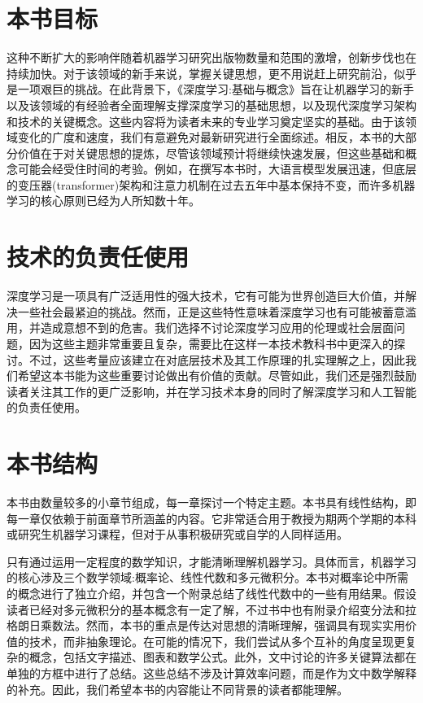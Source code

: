 \documentclass[10pt]{article}
\begin{document}
\section*{本书目标}

这种不断扩大的影响伴随着机器学习研究出版物数量和范围的激增，创新步伐也在持续加快。对于该领域的新手来说，掌握关键思想，更不用说赶上研究前沿，似乎是一项艰巨的挑战。在此背景下，《深度学习:基础与概念》旨在让机器学习的新手以及该领域的有经验者全面理解支撑深度学习的基础思想，以及现代深度学习架构和技术的关键概念。这些内容将为读者未来的专业学习奠定坚实的基础。由于该领域变化的广度和速度，我们有意避免对最新研究进行全面综述。相反，本书的大部分价值在于对关键思想的提炼，尽管该领域预计将继续快速发展，但这些基础和概念可能会经受住时间的考验。例如，在撰写本书时，大语言模型发展迅速，但底层的变压器(transformer)架构和注意力机制在过去五年中基本保持不变，而许多机器学习的核心原则已经为人所知数十年。

\section*{技术的负责任使用}

深度学习是一项具有广泛适用性的强大技术，它有可能为世界创造巨大价值，并解决一些社会最紧迫的挑战。然而，正是这些特性意味着深度学习也有可能被蓄意滥用，并造成意想不到的危害。我们选择不讨论深度学习应用的伦理或社会层面问题，因为这些主题非常重要且复杂，需要比在这样一本技术教科书中更深入的探讨。不过，这些考量应该建立在对底层技术及其工作原理的扎实理解之上，因此我们希望这本书能为这些重要讨论做出有价值的贡献。尽管如此，我们还是强烈鼓励读者关注其工作的更广泛影响，并在学习技术本身的同时了解深度学习和人工智能的负责任使用。

\section*{本书结构}

本书由数量较多的小章节组成，每一章探讨一个特定主题。本书具有线性结构，即每一章仅依赖于前面章节所涵盖的内容。它非常适合用于教授为期两个学期的本科或研究生机器学习课程，但对于从事积极研究或自学的人同样适用。

只有通过运用一定程度的数学知识，才能清晰理解机器学习。具体而言，机器学习的核心涉及三个数学领域:概率论、线性代数和多元微积分。本书对概率论中所需的概念进行了独立介绍，并包含一个附录总结了线性代数中的一些有用结果。假设读者已经对多元微积分的基本概念有一定了解，不过书中也有附录介绍变分法和拉格朗日乘数法。然而，本书的重点是传达对思想的清晰理解，强调具有现实实用价值的技术，而非抽象理论。在可能的情况下，我们尝试从多个互补的角度呈现更复杂的概念，包括文字描述、图表和数学公式。此外，文中讨论的许多关键算法都在单独的方框中进行了总结。这些总结不涉及计算效率问题，而是作为文中数学解释的补充。因此，我们希望本书的内容能让不同背景的读者都能理解。
\end{document}
